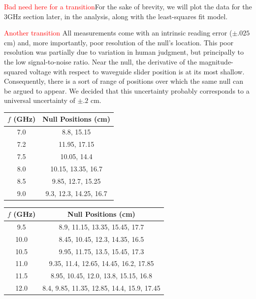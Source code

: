 \documentclass[12pt]{article}
\begin{document}



\textcolor{red}{Bad need here for a transition}For the sake of brevity, we will plot the data for the 3GHz section later, in the analysis, along with the least-squares fit model.

\textcolor{red}{Another transition} All measurements come with an intrinsic reading error ($\pm .025$ cm) and, more importantly, poor resolution of the null's location. This poor resolution was partially due to variation in human judgment, but principally to the low signal-to-noise ratio. Near the null, the derivative of the magnitude-squared voltage with respect to waveguide slider position is at its most shallow. Consequently, there is a sort of range of positions over which the same null can be argued to appear. We decided that this uncertainty probably corresponds to a universal uncertainty of $\pm .2$ cm.

\begin{center}
 \begin{tabular}{||c c||} 
 \hline
 $f$ (GHz) & Null Positions (cm)\\ [0.5ex] 
 \hline
 7.0 & 8.8, 15.15 \\ 
 \hline
 7.2 & 11.95, 17.15 \\
 \hline
 7.5 & 10.05, 14.4 \\ 
 \hline
 8.0 & 10.15, 13.35, 16.7 \\
 \hline
 8.5 & 9.85, 12.7, 15.25 \\
 \hline 
 9.0 & 9.3, 12.3, 14.25, 16.7 \\ [1ex] 
 \hline
\end{tabular}
 \begin{tabular}{||c c||} 
 \hline
 $f$ (GHz) & Null Positions (cm)\\ [0.5ex] 
 \hline
 9.5 & 8.9, 11.15, 13.35, 15.45, 17.7 \\ 
 \hline
 10.0 & 8.45, 10.45, 12.3, 14.35, 16.5 \\
 \hline
 10.5 & 9.95, 11.75, 13.5, 15.45, 17.3 \\
 \hline
 11.0 & 9.35, 11.4, 12.65, 14.45, 16.2, 17.85 \\
 \hline
 11.5 & 8.95, 10.45, 12.0, 13.8, 15.15, 16.8 \\
 \hline
 12.0 & 8.4, 9.85, 11.35, 12.85, 14.4, 15.9, 17.45 \\ [1ex] 
 \hline
\end{tabular}
\end{center}
\end{document}
